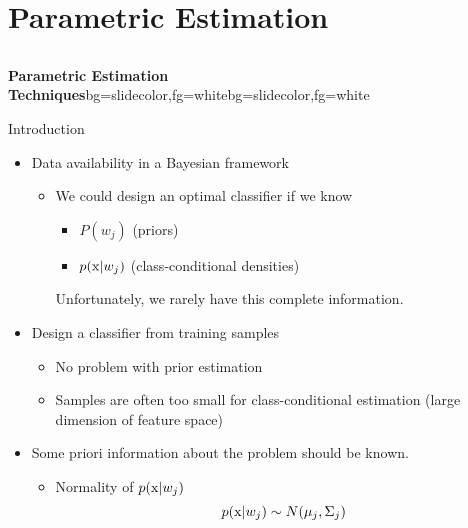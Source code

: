 \section{Parametric Estimation}
\subsection{}

\begin{frame}{}
\begin{variableblock}{\centering \Large \textbf{\vspace{4pt}\newline Parametric Estimation Techniques\vspace{4pt}}}{bg=slidecolor,fg=white}{bg=slidecolor,fg=white}
\end{variableblock}
\end{frame}

\begin{frame}{Introduction}
\begin{itemize}
\item Data availability in a Bayesian framework
\begin{itemize}
\item We could design an optimal classifier if we know
\begin{itemize}
\item $P(w_j)$ (priors)
\item $p({\rm x}|w_j)$ (class-conditional densities)
\end{itemize}
Unfortunately, we rarely have this complete information.
\end{itemize}
\item Design a classifier from training samples
\begin{itemize}
\item No problem with prior estimation
\item Samples are often too small for class-conditional estimation (large dimension of feature space)
\end{itemize}
\item Some priori information about the problem should be known.
\begin{itemize}
\item Normality of $p({\rm x}|w_j)$
\begin{equation}
p({\rm x}|w_j)\sim N(\mu_j,\Sigma_j)\nonumber
\end{equation}
\end{itemize}
\end{itemize}
\end{frame}

